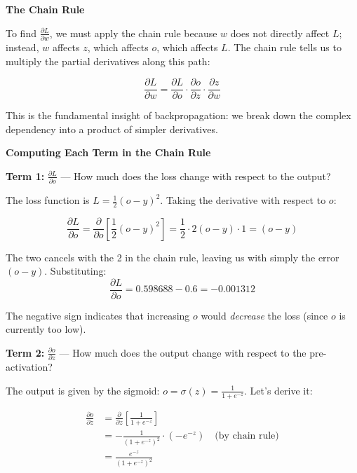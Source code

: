 \documentclass[12pt]{article}
\begin{document}
\vspace{0.2cm}

\noindent\textbf{The Chain Rule}

To find $\frac{\partial L}{\partial w}$, we must apply the chain rule because $w$ does not directly affect $L$; instead, $w$ affects $z$, which affects $o$, which affects $L$. The chain rule tells us to multiply the partial derivatives along this path:

\[
\frac{\partial L}{\partial w} = \frac{\partial L}{\partial o} \cdot \frac{\partial o}{\partial z} \cdot \frac{\partial z}{\partial w}
\]

This is the fundamental insight of backpropagation: we break down the complex dependency into a product of simpler derivatives.

\vspace{0.2cm}

\noindent\textbf{Computing Each Term in the Chain Rule}

\vspace{0.1cm}

\noindent\textbf{Term 1: } $\frac{\partial L}{\partial o}$ — How much does the loss change with respect to the output?

The loss function is $L = \frac{1}{2}(o - y)^2$. Taking the derivative with respect to $o$:

\[
\frac{\partial L}{\partial o} = \frac{\partial}{\partial o}\left[\frac{1}{2}(o - y)^2\right] = \frac{1}{2} \cdot 2(o - y) \cdot 1 = (o - y)
\]

The two cancels with the 2 in the chain rule, leaving us with simply the error $(o - y)$. Substituting:
\[
\frac{\partial L}{\partial o} = 0.598688 - 0.6 = -0.001312
\]

The negative sign indicates that increasing $o$ would \textit{decrease} the loss (since $o$ is currently too low).

\vspace{0.1cm}

\noindent\textbf{Term 2: } $\frac{\partial o}{\partial z}$ — How much does the output change with respect to the pre-activation?

The output is given by the sigmoid: $o = \sigma(z) = \frac{1}{1 + e^{-z}}$. Let's derive it:

\begin{align*}
\frac{\partial o}{\partial z} &= \frac{\partial}{\partial z}\left[\frac{1}{1 + e^{-z}}\right] \\
&= -\frac{1}{(1 + e^{-z})^2} \cdot (-e^{-z}) \quad \text{(by chain rule)} \\
&= \frac{e^{-z}}{(1 + e^{-z})^2}
\end{align*}
\end{document}
